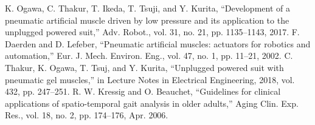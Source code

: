 \documentclass[letterpaper, 10 pt, conference]{ieeeconf}  %
\begin{document}
\begin{thebibliography}{10}
	K. Ogawa, C. Thakur, T. Ikeda, T. Tsuji, and Y. Kurita, “Development of a pneumatic artificial muscle driven by low pressure and its application to the unplugged powered suit,” Adv. Robot., vol. 31, no. 21, pp. 1135–1143, 2017.
	F. Daerden and D. Lefeber, “Pneumatic artificial muscles: actuators for robotics and automation,” Eur. J. Mech. Environ. Eng., vol. 47, no. 1, pp. 11–21, 2002.
	C. Thakur, K. Ogawa, T. Tsuj, and Y. Kurita, “Unplugged powered suit with pneumatic gel muscles,” in Lecture Notes in Electrical Engineering, 2018, vol. 432, pp. 247–251.
	R. W. Kressig and O. Beauchet, “Guidelines for clinical applications of spatio-temporal gait analysis in older adults,” Aging Clin. Exp. Res., vol. 18, no. 2, pp. 174–176, Apr. 2006.


\end{thebibliography}
\end{document}
